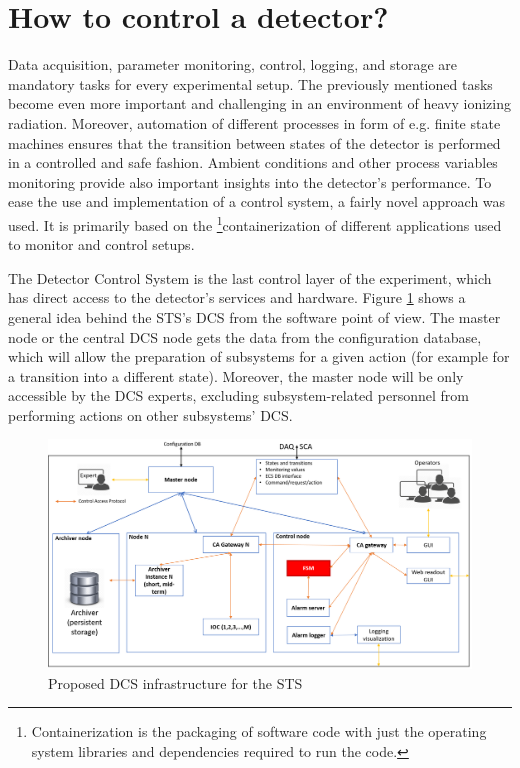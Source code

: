 \section{How to control a detector?}

Data acquisition, parameter monitoring, control, logging, and storage are mandatory tasks for every experimental setup. The previously mentioned tasks become even more important and challenging in an environment of heavy ionizing radiation. Moreover, automation of different processes in form of e.g. finite state machines ensures that the transition between states of the detector is performed in a controlled and safe fashion. Ambient conditions and other process variables monitoring provide also important insights into the detector's performance.  To ease the use and implementation of a control system, a fairly novel approach was used. It is primarily based on the \footnote{Containerization is the packaging of software code with just the operating system libraries and dependencies required to run the code.}{containerization} of different applications used to monitor and control setups. 

The Detector Control System is the last control layer of the experiment, which has direct access to the detector's services and hardware. Figure \ref{fig_arch} shows a general idea behind the \gls{STS}'s \gls{DCS} from the software point of view.  The master node or the central \gls{DCS} node gets the data from the configuration database, which will allow the preparation of subsystems for a given action (for example for a transition into a different state). Moreover, the master node will be only accessible by the \gls{DCS} experts, excluding subsystem-related personnel from performing actions on other subsystems' \gls{DCS}. 

\begin{figure}[!h]
\centering
\includegraphics[width=0.85\columnwidth]{Chapter3/Controls/images/DCS.png}
\caption{Proposed \gls{DCS} infrastructure for the \gls{STS}}
\label{fig_arch}
\end{figure}
\newpage





